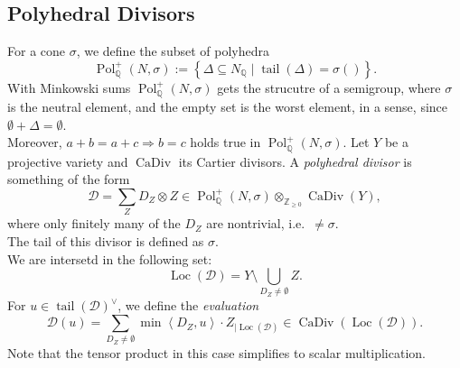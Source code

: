 \documentclass[a4paper]{article}
\DeclareMathOperator{\tail}{tail}
\DeclareMathOperator{\Pol}{Pol}
\DeclareMathOperator{\CaDiv}{CaDiv}
\DeclareMathOperator{\Loc}{Loc}
\theoremstyle{definition}
\begin{document}
  \subsection{Polyhedral Divisors}
  For a cone $\sigma$, we define the subset of polyhedra
  \[
    \Pol_{\mathbb{Q}}^{+}\left( N, \sigma \right) := \left\{ \Delta \subseteq N_{\mathbb{Q}} \mid \tail \left( \Delta \right) = \sigma\left(  \right)\right\}.
  \]
  With Minkowski sums $\Pol_{\mathbb{Q}}^{+}\left( N, \sigma\right) $ gets the strucutre of a semigroup, where $\sigma$ is the neutral element, and the empty set is the worst element, in a sense, since $\emptyset+ \Delta = \emptyset$.\\
  Moreover, $a + b = a + c \Rightarrow  b = c$ holds true in $\Pol_{\mathbb{Q}}^{+}\left( N, \sigma\right) $.
  Let $Y$ be a projective variety and $\CaDiv$ its Cartier divisors. A \emph{polyhedral divisor} is something of the form 
   \[
     \mathcal{ D}  = \sum_{Z } D_{Z} \otimes Z \in \Pol_{\mathbb{Q}}^{+}\left( N, \sigma\right)  \otimes_{\mathbb{Z}_{\geq 0}} \CaDiv \left( Y \right),
   \]
   where only finitely many of the $D_{Z}$ are nontrivial, i.e.~$\ne \sigma$.\\
   The tail of this divisor is defined as $\sigma$.\\
   We are intersetd in the following set:
   \[
     \Loc \left( \mathcal{ D}  \right) = Y  \setminus \bigcup_{D_{Z} \ne \emptyset} Z .
   \]
   For $u \in \tail \left( \mathcal{D}  \right) ^{\vee} $, we define the \emph{evaluation} 
   \[
     \mathcal{ D} \left( u \right)  = \sum_{D_{Z} \ne \emptyset } \min \left\langle  D_{Z} ,u\right\rangle \cdot Z_{\mid \Loc \left( \mathcal{D}  \right)} \in \CaDiv \left( \Loc \left( \mathcal{D}  \right) \right).
   \]
   Note that the tensor product in this case simplifies to scalar multiplication.
   
   
   
  

  
  
  
  
  
  
  
  
\end{document}
